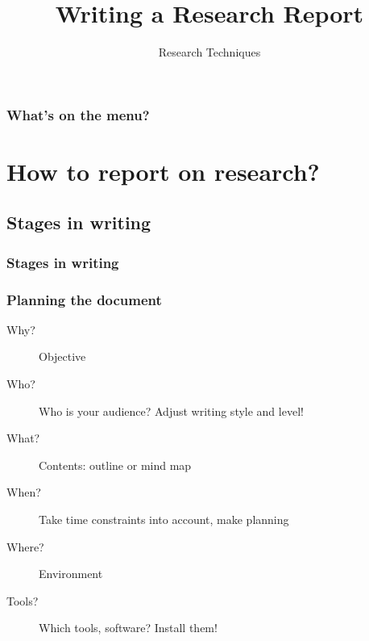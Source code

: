 \documentclass[aspectratio=169]{beamer}
\title{Writing a Research Report}
\subtitle{Research Techniques}
\begin{document}
\begin{frame}
  \maketitle
\end{frame}

\begin{frame}
  \frametitle{What's on the menu?}
  
  \tableofcontents
\end{frame}


\section{How to report on research?}

\subsection{Stages in writing}

\begin{frame}
  \frametitle{Stages in writing}
  \centering
\end{frame}

\begin{frame}
  \frametitle{Planning the document}
  
  \begin{description}
    \item[Why?] Objective
    \item[Who?] Who is your audience? Adjust writing style and level!
    \item[What?] Contents: outline or mind map
    \item[When?] Take time constraints into account, make planning
    \item[Where?] Environment
    \item[Tools?] Which tools, software? Install them!
  \end{description}
\end{frame}
\end{document}
